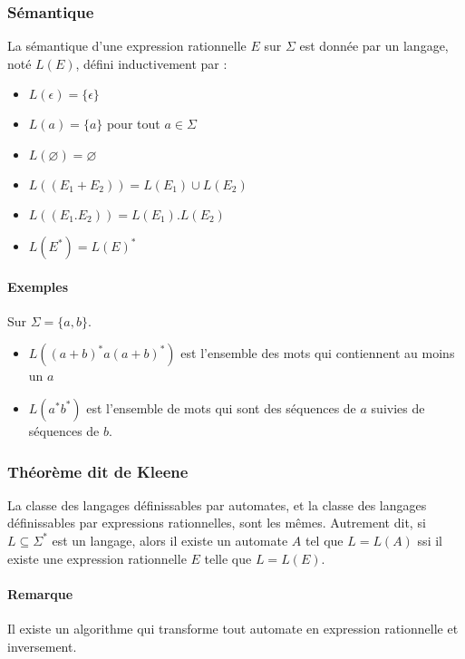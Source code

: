 \documentclass[a4paper]{article}
\begin{document}
  \subsubsection{Sémantique}
  La sémantique d'une expression rationnelle $E$ sur $\Sigma$ est donnée par un 
  langage, noté $L(E)$, défini inductivement par :
  \begin{itemize}
    \item $L(\epsilon) = \{\epsilon\}$
    \item $L(a) = \{a\}$ pour tout $a \in \Sigma$
    \item $L(\varnothing) = \varnothing$
    \item $L((E_1+E_2)) = L(E_1) \cup L(E_2)$
    \item $L((E_1.E_2)) = L(E_1) . L(E_2)$
    \item $L(E^*) = L(E)^*$
  \end{itemize}

  \paragraph{Exemples} Sur $\Sigma = \{a,b\}$.
  \begin{itemize}
    \item $L((a+b)^*a(a+b)^*)$ est l'ensemble des mots qui contiennent au moins un $a$
    \item $L(a^*b^*)$ est l'ensemble de mots qui sont des séquences de $a$ suivies 
    de séquences de $b$.
  \end{itemize}

  \subsubsection{Théorème dit de Kleene}
  La classe des langages définissables par automates, et la classe des langages
  définissables par expressions rationnelles, sont les mêmes. Autrement dit, si 
  $L \subseteq \Sigma^*$ est un langage, alors il existe un automate $A$ tel
  que $L = L(A)$ ssi il existe une expression rationnelle $E$ telle que $L = L(E)$.\\

  \paragraph{Remarque} Il existe un algorithme qui transforme tout automate
  en expression rationnelle et inversement.
\end{document}
